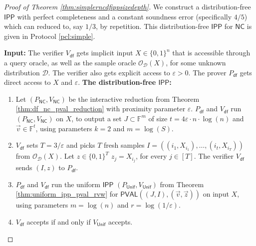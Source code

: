 \documentclass[11pt]{article}
\makeatletter
\newcommand{\NC}{\mathsf{NC}}
\newcommand{\PVAL}{\mathsf{PVAL}}
\newcommand{\IPP}{\mathsf{IPP}}
\newcommand{\F}{\mathbb{F}}
\newcommand{\sD}{\mathcal{D}}
\newcommand{\sO}{\mathcal{O}}
\newcommand{\eps}{\varepsilon}
\newenvironment{protocol}[1][htb]{
    \renewcommand{\ALG@name}{Protocol}
    \begin{algorithm}[#1]
    }{\end{algorithm}
}
\makeatother
\begin{document}
\begin{proof}[Proof of Theorem \ref{thm:simplerncdfippsizedepth}]
We construct a distribution-free $\IPP$ with perfect completeness and a constant soundness error (specifically $4/5$) which can reduced to, say $1/3$, by repetition. This distribution-free $\IPP$ for $\NC$ is given in Protocol \ref{pcl:simple}. 
\begin{protocol}[h!]
\caption{Distribution-free $\IPP$ for any language $L$ computable by circuits of size $S(n)$ and depth $\Delta_{L}(n)$.}
\label{pcl:simple}
\begin{algorithmic}{}
\vspace{0.1in}
\STATE \textbf{Input:} The verifier $V_{\mathsf{df}}$ gets implicit input $X\in \{0,1\}^{n}$ that is accessible through a query oracle, as well as the sample oracle $\sO_\sD(X)$, for some unknown distribution $\sD$. The verifier also gets explicit access to $\varepsilon > 0$. The prover $P_{\mathsf{df}}$ gets direct access to $X$ and $\varepsilon$.
\vspace{0.1in}
\STATE \textbf{The distribution-free $\IPP$:}

    \begin{enumerate}
    \item Let $(P_{\NC}, V_{\NC})$ be the interactive reduction from Theorem \ref{thm:df_nc_pval_reduction} with proximity parameter $\eps$. $P_{\mathsf{df}}$ and $V_{\mathsf{df}}$ run $(P_{\NC},V_{\NC})$ on $X$, to output a set $J \subset \F^m$ of size $t=4\varepsilon\cdot n\cdot\log (n)$ and $\Vec{v}\in \F^{t}$, using parameters $k = 2$ and $m = \log(S)$.
            
    \item \label{step:dfNCsimplesamples} $V_{\mathsf{df}}$ sets $T= 3/\varepsilon$ and picks $T$ fresh samples $I=((i_{1},X_{i_1}), \dots, (i_{t},X_{i_T}))$ from $\sO_\sD(X)$. Let $z\in \{0,1\}^{T}$ $z_{j}=X_{i_{j}}$, for every $j \in [T]$.
    The verifier    $V_{\mathsf{df}}$ sends $(I,z)$ to $P_{\mathsf{df}}$.

    \item \label{step:IPP_unif}$P_{\mathsf{df}}$ and $V_{\mathsf{df}}$ run the uniform $\IPP$ $(P_{\mathsf{Unif}}, V_{\mathsf{Unif}})$ from Theorem \ref{thm:uniform_ipp_pval_rvw} for $\PVAL((J, I), (\Vec{v},\Vec{z}))$ on input $X$, using parameters $m=\log (n)$ and $r=\log(1/\varepsilon)$.
    
    \item $V_\mathsf{df}$ accepts if and only if $V_\mathsf{Unif}$ accepts.
    \end{enumerate}
\item
\end{algorithmic}
\end{protocol}


\end{proof}
\end{document}
